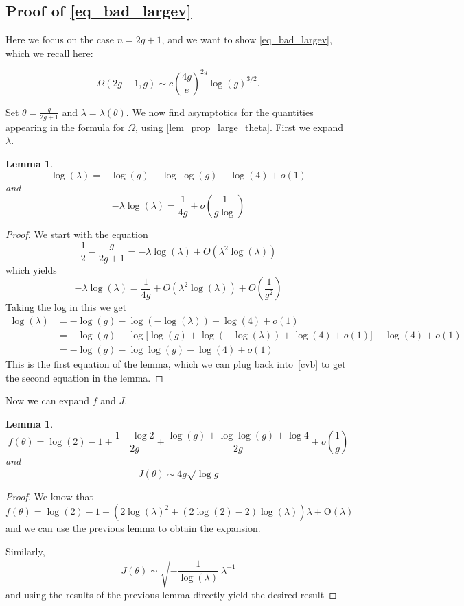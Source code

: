 \documentclass[a4paper,12pt]{article}
\newtheorem{lemma}[theorem]{Lemma}
\theoremstyle{definition}
\newcommand{\bigO}[1]{O\left({#1}\right)}
\newcommand{\smallo}[1]{o\left({#1}\right)}
\def \l{\lambda}
\def\ll{\log(\lambda)}
\def\lll{\log(-\ll)}
\begin{document}
\subsection{Proof of \eqref{eq_bad_largev}}\label{sec:proof_eq_bad_largev}
Here we focus on the case $n=2g+1$, and we want to show \eqref{eq_bad_largev}, which we recall here:

\[ \Omega(2g+1,g)\sim c\left(\frac{4g}{e}\right)^{2g}\log(g)^{3/2}.\]

Set $\theta=\frac{g}{2g+1}$ and $\l=\l(\theta)$. We now find asymptotics for the quantities appearing in the formula for $\Omega$, using \cref{lem_prop_large_theta}.
First we expand $\l$.

\begin{lemma}
    \[\ll=-\log(g)-\log\log(g)-\log(4)+o(1)\]
    and 
    \[-\l\log(\lambda)=\frac{1}{4g}+\smallo{\frac{1}{g\log}}\]
\end{lemma}
\begin{proof}
    We start with the equation
    \[\frac 1 2 -\frac{g}{2g+1}=-\lambda\log(\lambda)+\bigO{\lambda^2\log(\lambda)}\]
    which yields
    \begin{equation}\label{cvb}
        -\l\ll=\frac{1}{4g}+\bigO{\lambda^2\log(\lambda)}+\bigO{\frac{1}{g^2}}
    \end{equation}
    Taking the log in this we get
    \begin{align*}
        \ll&=-\log(g)-\lll-\log(4)+o(1)\\
        &=-\log(g)-\log\Big[\log(g)+\lll+\log(4)+o(1)\Big]-\log(4)+o(1)\\
        &=-\log(g)-\log\log(g)-\log(4)+o(1)
    \end{align*}
    This is the first equation of the lemma, which we can plug back into~\cref{cvb} to get the second equation in the lemma.
\end{proof}

Now we can expand $f$ and $J$.
\begin{lemma}
    \[f(\theta)=\log(2)-1+\frac{1-\log2}{2g}+\frac{\log(g)+\log\log(g)+\log 4}{2g}+\smallo{\frac{1}{g}}\]
    and
    \[J(\theta)\sim 4g\sqrt{\log g}\]
\end{lemma}
\begin{proof}
    We know that
    \[f(\theta)=\log\! \left(2\right)-1+\left(2 \log\! \left(\lambda \right)^{2}+\left(2 \log\! \left(2\right)-2\right) \log\! \left(\lambda \right)\right) \lambda +\mathrm{O}\! \left(\lambda\right)\]
    and we can use the previous lemma to obtain the expansion.

    Similarly,
    \[J(\theta)\sim\sqrt{-\frac{1}{\log\! \left(\lambda \right)}}\, \lambda^{-1}\]
    and using the results of the previous lemma directly yield the desired result
\end{proof}
\end{document}
